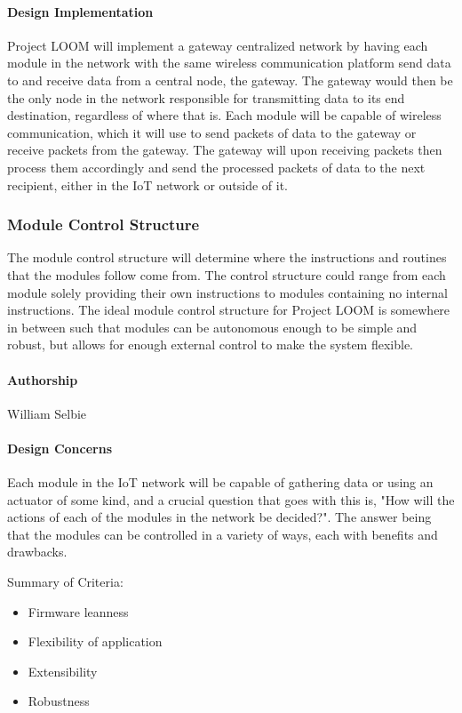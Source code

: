 \documentclass[onecolumn, draftclsnofoot,10pt, compsoc]{IEEEtran}
\begin{document}
\paragraph{Design Implementation}
    Project LOOM will implement a gateway centralized network by having each module in the network with the same wireless communication platform send data to and receive data from a central node, the gateway. The gateway would then be the only node in the network responsible for transmitting data to its end destination, regardless of where that is. Each module will be capable of wireless communication, which it will use to send packets of data to the gateway or receive packets from the gateway. The gateway will upon receiving packets then process them accordingly and send the processed packets of data to the next recipient, either in the IoT network or outside of it. 

\subsubsection{Module Control Structure}
    The module control structure will determine where the instructions and routines that the modules follow come from. The control structure could range from each module solely providing their own instructions to modules containing no internal instructions. The ideal module control structure for Project LOOM is somewhere in between such that modules can be autonomous enough to be simple and robust, but allows for enough external control to make the system flexible.

\paragraph{Authorship}
    William Selbie

\paragraph{Design Concerns}
    Each module in the IoT network will be capable of gathering data or using an actuator of some kind, and a crucial question that goes with this is, "How will the actions of each of the modules in the network be decided?". The answer being that the modules can be controlled in a variety of ways, each with benefits and drawbacks.

    Summary of Criteria: 
    \begin{itemize}[noitemsep,topsep=-10pt]
        \item Firmware leanness
        \item Flexibility of application
        \item Extensibility
        \item Robustness
    \end{itemize}
\end{document}
